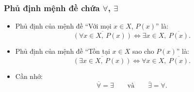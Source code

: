 \subsubsection{Phủ định mệnh đề chứa $\forall$, $\exists$}


\begin{emcothe}
\begin{itemize}
	\item Phủ định của mệnh đề ``Với mọi $x\in X$, $P(x)$'' là:
	\[
	\overline{\left(\forall x\in X,\ P(x)\right)}
	\Leftrightarrow
	\exists x\in X,\ \overline{P(x)}.
	\]
	
	\item Phủ định của mệnh đề ``Tồn tại $x\in X$ sao cho $P(x)$'' là:
	\[
	\overline{\left(\exists x\in X,\ P(x)\right)}
	\Leftrightarrow
	\forall x\in X,\ \overline{P(x)}.
	\]
	
	\item Cần nhớ:
	\[
	\boxed{\overline{\forall}=\exists}
	\qquad\text{và}\qquad
	\boxed{\overline{\exists}=\forall}.
	\]
\end{itemize}
\end{emcothe}
